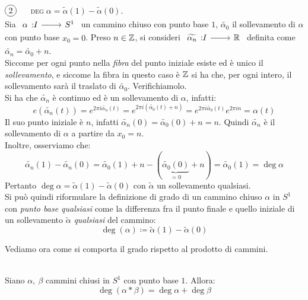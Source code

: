 \begin{observe}$\circled{2}\quad$ \textsc{$\deg\alpha = \widetilde{\alpha}(1)- \widetilde{\alpha}(0)$.}\\
	Sia $\funz \alpha I {S^1}$ un cammino chiuso con punto base $1$, $\widetilde{\alpha_0}$ il sollevamento di $\alpha$ con punto base $x_0=0$. Preso $n\in\mathbb{Z}$, si consideri $\funz {\widetilde{\alpha_n}} I \realset$ definita come $\widetilde{\alpha_n}=\widetilde{\alpha_0}+n$.\\
	Siccome per ogni punto nella \textit{fibra} del punto iniziale esiste ed è unico il \textit{sollevamento}, e siccome la fibra in questo caso è $\mathbb{Z}$ si ha che, per ogni intero, il sollevamento sarà il traslato di $\widetilde{\alpha_0}$. Verifichiamolo.\\
	Si ha che $\widetilde{\alpha_n}$ è continuo ed è un sollevamento di $\alpha$, infatti:
		\begin{equation*}
			e\left( \widetilde{\alpha_n}(t) \right)= e^{2\pi i \widetilde{\alpha_n}(t)}= e^{2\pi i (\widetilde{\alpha_0}(t)+n)}=e^{2\pi i \widetilde{\alpha_0}(t)} e^{2\pi i n}=\alpha(t)
		\end{equation*}
	Il suo punto iniziale è $n$, infatti $\widetilde{\alpha_n}(0)=\widetilde{\alpha_0}(0)+n=n$.	Quindi $\widetilde{\alpha_n}$ è il sollevamento di $\alpha$ a partire da $x_0=n$.\\
	Inoltre, osserviamo che:
		\begin{equation*}
			\widetilde{\alpha_n}(1)- \widetilde{\alpha_n}(0)=\widetilde{\alpha_0}(1)+n - (\underbrace{\widetilde{\alpha_0}(0)}_{=0}+n)= \widetilde{\alpha_0}(1)=\deg\alpha
		\end{equation*}
	Pertanto $\deg\alpha= \widetilde{\alpha}(1)-\widetilde{\alpha}(0)$ con $\widetilde{\alpha}$ un sollevamento qualsiasi.\\
	Si può quindi riformulare la definizione di grado di un cammino chiuso $\alpha$ in $S^1$ con \textit{punto base qualsiasi} come la differenza fra il punto finale e quello iniziale di un sollevamento $\widetilde{\alpha}$ \textit{qualsiasi} del cammino:
	\begin{equation}
		\deg (\alpha)\coloneqq \widetilde{\alpha}(1)-\widetilde{\alpha}(0)
	\end{equation}
\vspace{-6mm}
\end{observe}
Vediamo ora come si comporta il grado rispetto al prodotto di cammini.
\begin{theorema}~{}\\
	Siano $\alpha,\ \beta$ cammini chiusi in $S^1$ con punto base $1$. Allora:
	\begin{equation}
		\deg(\alpha\ast\beta)=\deg\alpha + \deg\beta
	\end{equation}
\vspace{-6mm}
\end{theorema}
